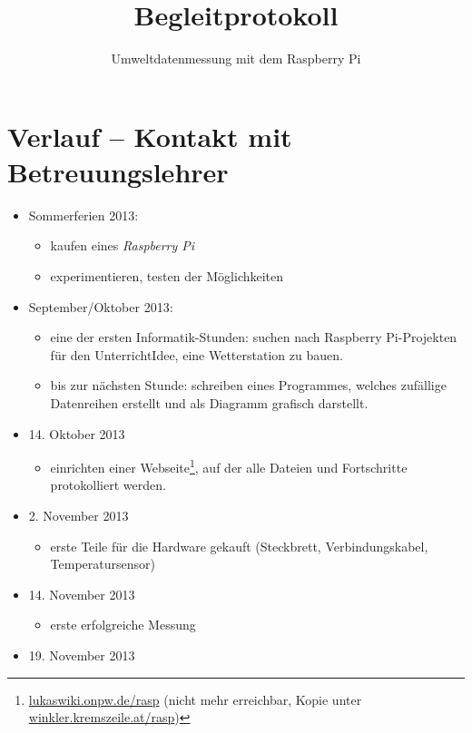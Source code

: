 \documentclass[12pt,a4paper,oneside,DIV=14]{scrartcl}
\author{\myauthor}
\title{Begleitprotokoll}
\subtitle{Umweltdatenmessung mit dem Raspberry Pi}
\begin{document}
\maketitle

\section{Verlauf -- Kontakt mit Betreuungslehrer}
\begin{multicols}{2}
\begin{itemize}

	\item Sommerferien 2013:
	\begin{itemize}
		\item kaufen eines \emph{Raspberry Pi}
		\item experimentieren, testen der Möglichkeiten
	\end{itemize}
	\item September/Oktober 2013:
	\begin{itemize}
		\item eine der ersten Informatik-Stunden: suchen nach Raspberry Pi-Projekten für den Unterricht\newline Idee, eine Wetterstation zu bauen.
		\item bis zur nächsten Stunde: schreiben eines Programmes, welches zufällige Datenreihen erstellt und als Diagramm grafisch darstellt.
	\end{itemize}
	\item 14. Oktober 2013
	\begin{itemize}
		\item einrichten einer Webseite\footnote{\href{http://lukaswiki.onpw.de/rasp/}{lukaswiki.onpw.de/rasp} (nicht mehr erreichbar, Kopie unter \href{http://winkler.kremszeile.at/rasp/}{winkler.kremszeile.at/rasp})}, auf der alle Dateien und Fortschritte protokolliert werden.
	\end{itemize}
	\item 2. November 2013
	\begin{itemize}
		\item erste Teile für die Hardware gekauft (Steckbrett, Verbindungskabel, Temperatursensor)
	\end{itemize}
	\item 14. November 2013
	\begin{itemize}
		\item erste erfolgreiche Messung
	\end{itemize}
	\item 19. November 2013

\end{itemize}
\end{multicols}
\end{document}

